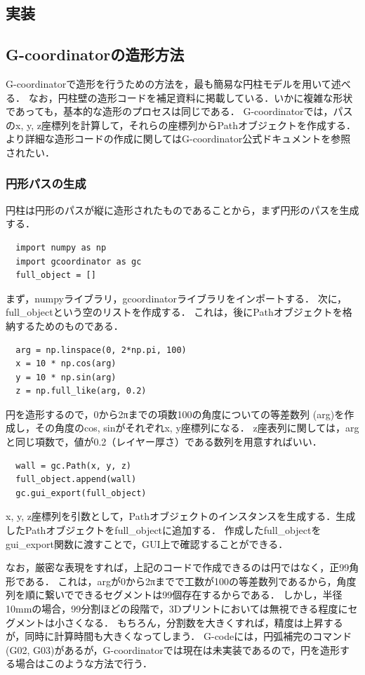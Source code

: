 \documentclass{article}
\begin{document}
\begin{twocolumn}
\section{実装}
\subsection{G-coordinatorの造形方法}
G-coordinatorで造形を行うための方法を，最も簡易な円柱モデルを用いて述べる．
なお，円柱壁の造形コードを補足資料に掲載している．いかに複雑な形状であっても，基本的な造形のプロセスは同じである．
G-coordinatorでは，パスのx, y, z座標列を計算して，それらの座標列からPathオブジェクトを作成する．
より詳細な造形コードの作成に関してはG-coordinator公式ドキュメントを参照されたい．
\subsubsection{円形パスの生成}
円柱は円形のパスが縦に造形されたものであることから，まず円形のパスを生成する．

\begin{lstlisting}
  import numpy as np
  import gcoordinator as gc
  full_object = []
\end{lstlisting}

まず，numpyライブラリ，gcoordinatorライブラリをインポートする．
次に，full\_objectという空のリストを作成する．
これは，後にPathオブジェクトを格納するためのものである．

\begin{lstlisting}
  arg = np.linspace(0, 2*np.pi, 100)
  x = 10 * np.cos(arg)
  y = 10 * np.sin(arg)
  z = np.full_like(arg, 0.2)
\end{lstlisting}

円を造形するので，0から2πまでの項数100の角度についての等差数列
(arg)を作成し，その角度のcos, sinがそれぞれx, y座標列になる．
z座表列に関しては，argと同じ項数で，値が0.2（レイヤー厚さ）である数列を用意すればいい．

\begin{lstlisting}
  wall = gc.Path(x, y, z)
  full_object.append(wall)
  gc.gui_export(full_object)
\end{lstlisting}

x, y, z座標列を引数として，Pathオブジェクトのインスタンスを生成する．生成したPathオブジェクトをfull\_objectに追加する．
作成したfull\_objectをgui\_export関数に渡すことで，GUI上で確認することができる．

なお，厳密な表現をすれば，上記のコードで作成できるのは円ではなく，正99角形である．
これは，argが0から2πまでで工数が100の等差数列であるから，角度列を順に繋いでできるセグメントは99個存在するからである．
しかし，半径10mmの場合，99分割ほどの段階で，3Dプリントにおいては無視できる程度にセグメントは小さくなる．
もちろん，分割数を大きくすれば，精度は上昇するが，同時に計算時間も大きくなってしまう．
G-codeには，円弧補完のコマンド(G02, G03)があるが，G-coordinatorでは現在は未実装であるので，円を造形する場合はこのような方法で行う．


\end{twocolumn}
\end{document}
